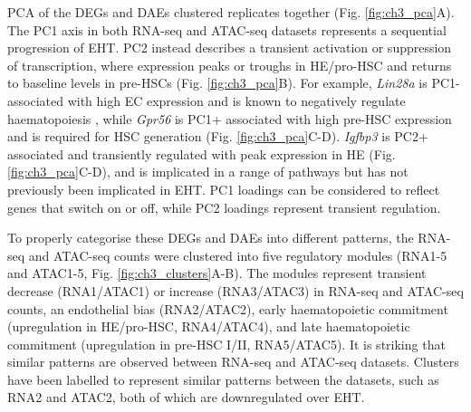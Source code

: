 PCA of the DEGs and DAEs clustered replicates together (Fig. \ref{fig:ch3_pca}A). The PC1 axis in both RNA-seq and ATAC-seq datasets represents a sequential progression of EHT. PC2 instead describes a transient activation or suppression of transcription, where expression peaks or troughs in HE/pro-HSC and returns to baseline levels in pre-HSCs (Fig. \ref{fig:ch3_pca}B). For example, \textit{Lin28a} is PC1- associated with high EC expression and is known to negatively regulate haematopoiesis \citep{chaudhuri_oncomir_2012}, while \textit{Gpr56} is PC1+ associated with high pre-HSC expression and is required for HSC generation \citep{solaimani_kartalaei_whole-transcriptome_2015} (Fig. \ref{fig:ch3_pca}C-D). \textit{Igfbp3} is PC2+ associated and transiently regulated with peak expression in HE (Fig. \ref{fig:ch3_pca}C-D), and is implicated in a range of pathways \citep{baxter_insulin-like_2013} but has not previously been implicated in EHT. PC1 loadings can be considered to reflect genes that switch on or off, while PC2 loadings represent transient regulation.

To properly categorise these DEGs and DAEs into different patterns, the RNA-seq and ATAC-seq counts were clustered into five regulatory modules (RNA1-5 and ATAC1-5, Fig. \ref{fig:ch3_clusters}A-B). The modules represent transient decrease (RNA1/ATAC1) or increase (RNA3/ATAC3) in RNA-seq and ATAC-seq counts, an endothelial bias (RNA2/ATAC2), early haematopoietic commitment (upregulation in HE/pro-HSC, RNA4/ATAC4), and late haematopoietic commitment (upregulation in pre-HSC I/II, RNA5/ATAC5). It is striking that similar patterns are observed between RNA-seq and ATAC-seq datasets. Clusters have been labelled to represent similar patterns between the datasets, such as RNA2 and ATAC2, both of which are downregulated over EHT. 

